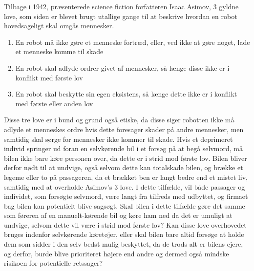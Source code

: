 	Tilbage i 1942, præsenterede science fiction forfatteren Isaac Asimov, 3 gyldne love, som siden er blevet brugt utallige gange til at beskrive hvordan en robot hovedsageligt skal omgås mennesker.
	
	\begin{enumerate}
		
		\item En robot må ikke gøre et menneske fortræd, eller, ved ikke at gøre noget, lade et menneske komme til skade
		\item En robot skal adlyde ordrer givet af mennesker, så længe disse ikke er i konflikt med første lov
		\item En robot skal beskytte sin egen eksistens, så længe dette ikke er i konflikt med første eller anden lov
		
	\end{enumerate}
	\cite{Asimov}
	Disse tre love er i bund og grund også etiske, da disse siger robotten ikke må adlyde et menneskes ordre hvis dette foresager skader på andre mennesker, men samtidig skal sørge for mennesker ikke kommer til skade. Hvis et deprimeret individ springer ud foran en selvkørende bil i et forsøg på at begå selvmord, må bilen ikke bare køre personen over, da dette er i strid mod første lov. Bilen bliver derfor nødt til at undvige, også selvom dette kan totalskade bilen, og brække et legeme eller to på passageren, da et brækket ben er langt bedre end et mistet liv, samtidig med at overholde Asimov's 3 love. I dette tilfælde, vil både passager og individet, som forsøgte selvmord, være langt fra tilfreds med udbyttet, og firmaet bag bilen kan potentielt blive sagsøgt. Skal bilen i dette tilfælde gøre det samme som føreren af en manuelt-kørende bil og køre ham ned da det er umuligt at undvige, selvom dette vil være i strid mod første lov? Kan disse love overhovedet bruges indenfor selvkørende køretøjer, eller skal bilen bare altid forsøge at holde dem som sidder i den selv bedst mulig beskyttet, da de trods alt er bilens ejere, og derfor, burde blive prioriteret højere end andre og dermed også mindske risikoen for potentielle retssager? 